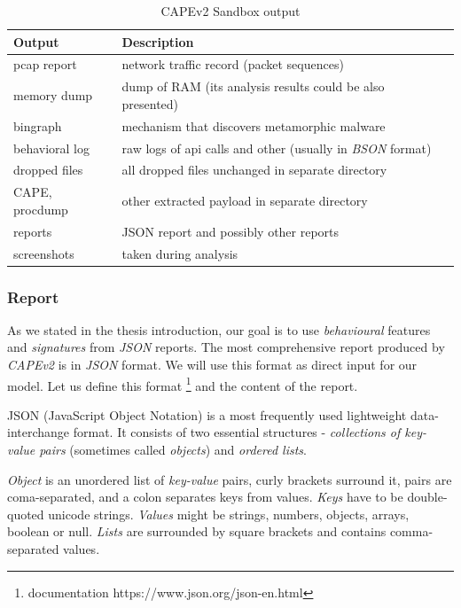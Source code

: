 \begin{table}[h]
  \centering
  \caption{CAPEv2 Sandbox output}
  \begin{tabular}{p{2cm}p{6cm}p{6cm}} 
      \toprule
      \textbf{Output} &
      \textbf{Description} \\
      \midrule
      pcap report & network traffic record (packet sequences) \\
      \midrule
      memory dump & dump of RAM (its analysis results could be also presented) \\
      \midrule
      bingraph & mechanism that discovers metamorphic malware \cite{Kwon2012}\\
      \midrule
      behavioral log & raw logs of api calls and other (usually in \emph{BSON} format) \\
      \midrule
      dropped files & all dropped files unchanged in separate directory \\
      \midrule
      CAPE, procdump & other extracted payload in separate directory \\
      \midrule
      reports & JSON report and possibly other reports  \\
      \midrule
      screenshots & taken during analysis  \\
      \bottomrule
  \end{tabular}
  \label{tab:sandbox-out}
\end{table}


\subsubsection{Report}
As we stated in the thesis introduction, our goal is to use \emph{behavioural} features and \emph{signatures} from \emph{JSON} reports.  The most comprehensive report produced by \emph{CAPEv2} is in \emph{JSON} format. We will use this format as direct input for our model. Let us define this format \footnote{documentation https://www.json.org/json-en.html} and the content of the report.

JSON (JavaScript Object Notation) is a most frequently used lightweight data-interchange format. It consists of two essential structures - \emph{collections of key-value pairs} (sometimes called \emph{objects}) and \emph{ordered lists}. 

\emph{Object} is an unordered list of \emph{key-value} pairs, curly brackets surround it, pairs are coma-separated, and a colon separates keys from values. \emph{Keys} have to be double-quoted unicode strings. \emph{Values} might be strings, numbers, objects, arrays, boolean or null. \emph{Lists} are surrounded by square brackets and contains comma-separated values.

